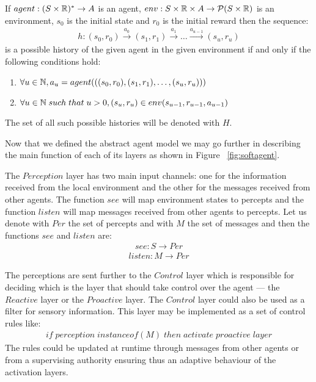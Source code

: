 If $agent: (S \times \mathbb R)^{*} \rightarrow A$ is an agent, $env:S \times \mathbb{R} \times A \rightarrow \mathcal P (S \times \mathbb{R})$ is an environment, $s_{0}$ is the initial state and $r_{0}$ is the initial reward then the sequence:
\begin{align}
h: (s_{0},r_{0}) \xrightarrow{a_{0}} (s_{1},r_{1}) \xrightarrow{a_{1}} \ldots \xrightarrow{a_{u-1}} (s_{u},r_{u})
\end{align}
is a possible history of the given agent in the given environment if and only if the following conditions hold:
\begin{enumerate}
\item
$\forall u \in \mathbb N, a_{u}=agent(((s_{0},r_{0}),(s_{1},r_{1}),\ldots ,(s_{u},r_{u})))$
\item
$\forall u \in \mathbb N \; such \; that \; u > 0, (s_{u},r_{u}) \in env(s_{u-1}, r_{u-1},a_{u-1})$
\end{enumerate}
The set of all such possible histories will be denoted with $H$.

Now that we defined the abstract agent model we may go further in describing the main function of each of its layers as shown in Figure ~\ref{fig:softagent}.

The $Perception$ layer has two main input channels: one for the information received from the local environment and the other for the messages received from other agents. The function $see$ will map environment states to percepts and the function $listen$ will map messages received from other agents to percepts. Let us denote with $Per$ the set of percepts and with $M$ the set of messages and then the functions $see$ and $listen$ are:
\begin{align}
see: S \rightarrow Per
\label{fn:see}
\end{align}
\begin{align}
listen: M \rightarrow Per
\end{align}

The perceptions are sent further to the $Control$ layer which is responsible for deciding which is the layer that should take control over the agent --- the $Reactive$ layer or the $Proactive$ layer. The $Control$ layer could also be used as a filter for sensory information. This layer may be implemented as a set of control rules like:
\begin{align}
if \; perception \;  instanceof(M) \;  then  \; activate \; proactive \; layer
\end{align}
The rules could be updated at runtime through messages from other agents or from a supervising authority ensuring thus an adaptive behaviour of the activation layers. 

